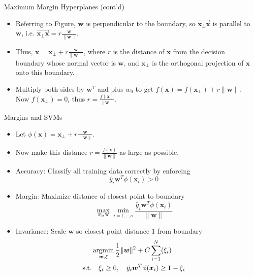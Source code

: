 \documentclass[10pt,mathserif]{beamer}
\begin{document}
\begin{frame}{Maximum Margin Hyperplanes (cont'd)}
\begin{itemize}
    \item Referring to Figure, $\bm{w}$ is perpendicular to the boundary, so $\overrightarrow{\bm{x}_\perp \bm{x}}$ is parallel to $\bm{w}$, i.e. $\overrightarrow{\bm{x}_\perp \bm{x}}  = r\frac{\bm{w}}{\|\bm{w}\|}$.
    \item Thus, $\bm{x} = \bm{x}_\perp + r\frac{\bm{w}}{\|\bm{w}\|}$,
    where $r$ is the distance of $\bm{x}$ from the decision boundary whose normal vector is $\bm{w}$, and $\bm{x}_\perp$ is the orthogonal projection of $\bm{x}$ onto this boundary. 
    \item Multiply both sides by $\bm{w}^T$ and plus $w_0$ to get $f(\bm{x}) = f(\bm{\bm{x}}_\perp)+r\|\bm{w}\|$. Now $f(\bm{x}_\perp) = 0$, thus $r = \frac{f(\bm{x})}{\|\bm{w}\|}$.
\end{itemize}
\end{frame}

\begin{frame}{Margins and SVMs}
\begin{itemize}
    \item Let $\phi(\bm{x}) = \bm{x}_\perp + r\frac{\bm{w}}{\|\bm{w}\|}$.
    \item Now make this distance $r = \frac{f(\bm{x})}{\|\bm{w}\|}$ as large as possible. 
    \item Accuracy: Classify all training data correctly by enforcing
    \begin{equation*}
        \tilde{y_i} \bm{w}^T\phi(\bm{x}_i) > 0
    \end{equation*}
    \item Margin: Maximize distance of closest point to boundary 
    \begin{equation*}
        \max_{w_0,\bm{w}}\min_{i=1,\ldots n}\frac{\tilde{y_i} \bm{w}^T\phi(\bm{x}_i)}{\|\bm{w}\|}
    \end{equation*}
    \item Invariance: Scale $\bm{w}$ so closest point distance 1 from boundary 
    \begin{equation*}
        \begin{split}
            & \mathop{\rm argmin}_{\bm{w},\xi} \frac{1}{2}\|\bm{w}\|^2 + C\sum_{i=1}^N (\xi_i)\\
            \text{s.t.} & \quad \xi_i\geq 0, \quad \tilde{y_i} \bm{w}^T\phi(\bm{x}_i)\geq 1-\xi_i
        \end{split}
    \end{equation*}
\end{itemize}
\end{frame}
\end{document}

